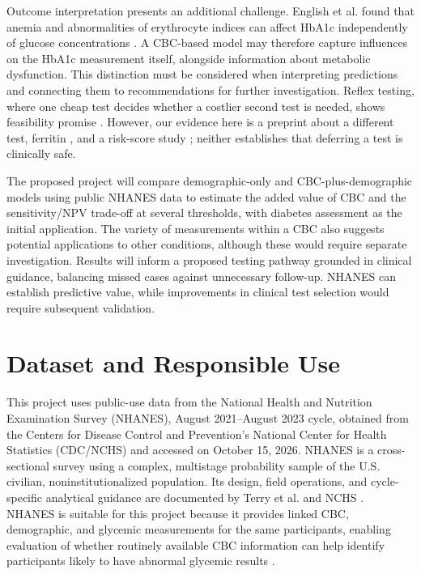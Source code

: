 \documentclass[conference]{IEEEtran}
\begin{document}
Outcome interpretation presents an additional challenge. English et al.\cite{english2015} found that anemia and abnormalities of erythrocyte indices can affect HbA1c independently of glucose concentrations . A CBC-based model may therefore capture influences on the HbA1c measurement itself, alongside information about metabolic dysfunction. This distinction must be considered when interpreting predictions and connecting them to recommendations for further investigation. Reflex testing, where one cheap test decides whether a costlier second test is needed, shows feasibility promise \cite{mcdermott2023}. However, our evidence here is a preprint about a different test, ferritin \cite{mcdermott2023}, and a risk-score study \cite{bang2009}; neither establishes that deferring a test is clinically safe.


The proposed project will compare demographic-only and CBC-plus-demographic models using public NHANES data to estimate the added value of CBC and the sensitivity/NPV trade-off at several thresholds, with diabetes assessment as the initial application. The variety of measurements within a CBC also suggests potential applications to other conditions, although these would require separate investigation. Results will inform a proposed testing pathway grounded in clinical guidance, balancing missed cases against unnecessary follow-up. NHANES can establish predictive value, while improvements in clinical test selection would require subsequent validation.


\section{Dataset and Responsible Use}

This project uses public-use data from the National Health and Nutrition Examination Survey (NHANES), August 2021--August 2023 cycle, obtained from the Centers for Disease Control and Prevention's National Center for Health Statistics (CDC/NCHS) and accessed on October 15, 2026. NHANES is a cross-sectional survey using a complex, multistage probability sample of the U.S. civilian, noninstitutionalized population. Its design, field operations, and cycle-specific analytical guidance are documented by Terry et al. \cite{terry2024} and NCHS \cite{nhanes_overview}. NHANES is suitable for this project because it provides linked CBC, demographic, and glycemic measurements for the same participants, enabling evaluation of whether routinely available CBC information can help identify participants likely to have abnormal glycemic results \cite{demo_l,cbc_l,ghb_l,glu_l,diq_l}.
\end{document}
